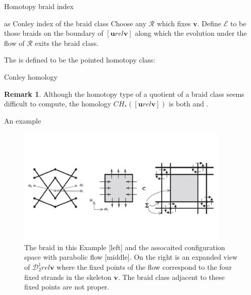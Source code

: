 \documentclass[9pt, english]{beamer}
\theoremstyle{definition}
\newtheorem{oss}[thm]{Remark}
\newcommand{\simbolovettore}[1]{{\boldsymbol{#1}}}
\newcommand{\vh}{\simbolovettore{h}}
\newcommand{\vu}{\simbolovettore{u}}
\newcommand{\vv}{\simbolovettore{v}}
\begin{document}
\begin{frame}{Homotopy braid index}
    \begin{block}{as Conley index of the braid class}\pause
        Choose any $\mathscr R$ which fixes $\vv$. Define $\mathscr E$
        to be those braids on the boundary of $[\vu rel \vv]$ along
        which the evolution under the flow of $\mathscr R$ exits the
        braid class.\pause

        The {\color{red}{homotopy braid index}\/} is defined to be the pointed homotopy
        class:\pause
        {\color{blue}{
        \[
        \vh([\vu rel\vv]):=([\vu rel \vv]/\mathscr E, \{\mathscr E\}).
        \]}\/}
    \end{block}
\end{frame}
\begin{frame}{Conley homology}
    \begin{oss}\pause
    Although the homotopy type of a quotient of a braid class seems
    difficult to compute, the homology $CH_*([\vu rel \vv])$ is both
    {\color{red}{efficacious}\/} and {\color{red}{computable}.\/}
    \end{oss}
\end{frame}
\begin{frame}{An example}
\begin{figure}\label{fig:example}
        \includegraphics[width=0.9\textwidth]{images/Fig5Inventiones2.pdf}\caption{The braid in this Example [left]
        and the assocaited configuration space with parabolic flow [middle]. On the right is an expanded view
         of $\mathscr D_2^1 rel \vv$ where the fixed points of the flow correspond to the four fixed strands in the
         skeleton $\vv$. The braid class adjacent to these fixed points are not proper.}
        \end{figure}
\end{frame}
\end{document}
